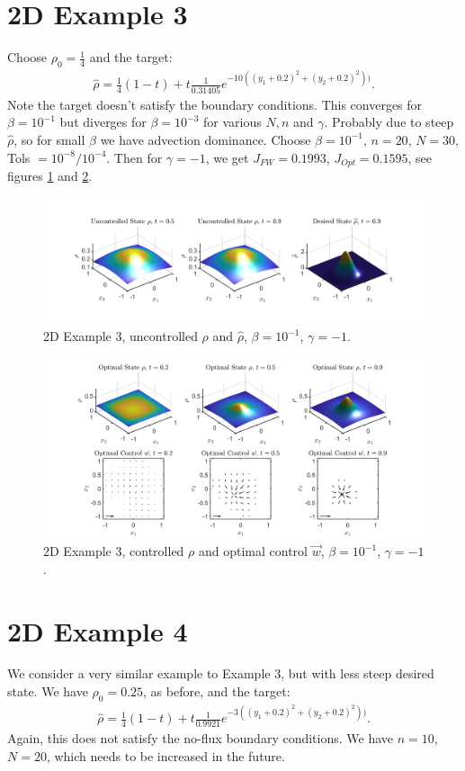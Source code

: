 \documentclass[11pt, a4paper]{article}
\theoremstyle{definition}
\begin{document}
\section{2D Example 3}
Choose $\rho_0 = \frac{1}{4}$ and the target:
\begin{align*}
\widehat \rho = \frac{1}{4}(1-t) + t\frac{1}{0.31405}e^{-10((y_1+0.2)^2 + (y_2+0.2)^2))}.
\end{align*}
Note the target doesn't satisfy the boundary conditions.	
This converges for $\beta = 10^{-1}$ but diverges for $\beta = 10^{-3}$ for various $N,n$ and $\gamma$. Probably due to steep $\widehat \rho$, so for small $\beta$ we have advection dominance.
Choose $\beta = 10^{-1}$, $n =20$, $N=30$, Tols $= 10^{-8}/10^{-4}$. Then for $\gamma = -1$, we get $J_{FW} = 0.1993$, $J_{Opt} = 0.1595$, see figures \ref{rhoHat2d1} and \ref{rhoOpt2d1}.
\begin{figure}[h]
	\includegraphics[scale=0.3]{Res1.png}
	\caption{2D Example 3, uncontrolled $\rho$ and $\widehat \rho$, $\beta = 10^{-1}$, $\gamma = -1$.}
	\label{rhoHat2d1}
\end{figure}
\begin{figure}[h]
	\includegraphics[scale=0.3]{Res2.png}
	\caption{2D Example 3, controlled $\rho$ and optimal control $\vec{w}$, $\beta = 10^{-1}$, $\gamma = -1$.}
	\label{rhoOpt2d1}
\end{figure}	

	
\section{2D Example 4}
We consider a very similar example to Example 3, but with less steep desired state.
We have $\rho_0 = 0.25$, as before, and the target:
\begin{align*}
\widehat \rho = \frac{1}{4}(1-t) + t\frac{1}{0.9921}e^{-3((y_1+0.2)^2 + (y_2+0.2)^2))}.
\end{align*}
Again, this does not satisfy the no-flux boundary conditions.
We have $n=10$, $N=20$, which needs to be increased in the future. 
\end{document}
